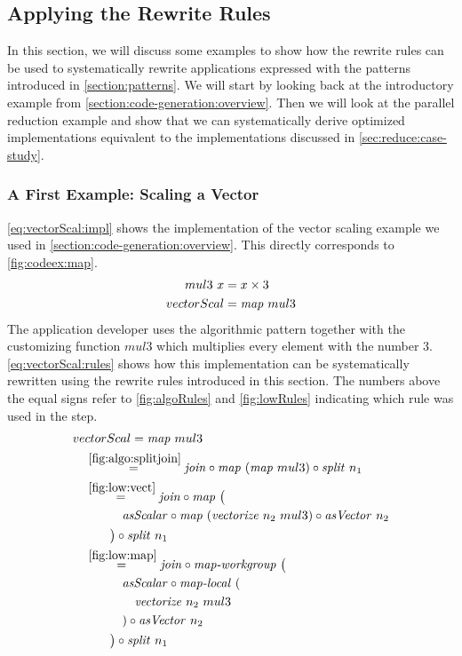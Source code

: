 \subsection{Applying the Rewrite Rules}
\label{sec:example}
\label{sec:applying:rules}
In this section, we will discuss some examples to show how the rewrite rules can be used to systematically rewrite applications expressed with the patterns introduced in \autoref{section:patterns}.
We will start by looking back at the introductory example from \autoref{section:code-generation:overview}.
Then we will look at the parallel reduction example and show that we can systematically derive optimized implementations equivalent to the implementations discussed in \autoref{sec:reduce:case-study}.

\subsubsection{A First Example: Scaling a Vector}
\autoref{eq:vectorScal:impl} shows the implementation of the vector scaling example we used in \autoref{section:code-generation:overview}.
This directly corresponds to \autoref{fig:codeex:map}.
\begin{align}
  mul3\ x &= x \times 3\nonumber\\
  vectorScal &= \text{\textit{map}}\ mul3
  \label{eq:vectorScal:impl}
\end{align}
The application developer uses the algorithmic pattern \map together with the customizing function $mul3$ which multiplies every element with the number $3$.
\autoref{eq:vectorScal:rules} shows how this implementation can be systematically rewritten using the rewrite rules introduced in this section.
The numbers above the equal signs refer to \autoref{fig:algoRules} and \autoref{fig:lowRules} indicating which rule was used in the step.
\begin{align}
  &vectorScal = \text{\textit{map}}\ mul3\nonumber\\
  &\quad\begin{aligned}
    &\overset{\ref{fig:algo:splitjoin}}{=\hspace{.2em}}
      \text{\textit{join}} \circ \text{\textit{map}}\ (\text{\textit{map}}\ mul3) \circ \text{\textit{split}}\ n_1\\
    &\overset{\ref{fig:low:vect}}{=\hspace{.2em}}
      \text{\textit{join}} \circ \text{\textit{map}}\ \big(\\
      &\qquad\quad \text{\textit{asScalar}} \circ \text{\textit{map}}\ (\text{\textit{vectorize}}\ n_2\ mul3) \circ \text{\textit{asVector}}\ n_2\\
      &\qquad\big) \circ \text{\textit{split}}\ n_1\\
    &\overset{\ref{fig:low:map}}{=\hspace{.2em}}
      \text{\textit{join}} \circ \text{\textit{map-workgroup}}\ \big(\\
      &\qquad\quad \text{\textit{asScalar}} \circ \text{\textit{map-local}}\ (\\
      &\qquad\qquad\text{\textit{vectorize}}\ n_2\ mul3\\
      &\qquad\quad) \circ \text{\textit{asVector}}\ n_2\\
      &\qquad\big) \circ \text{\textit{split}}\ n_1
  \end{aligned}
  \label{eq:vectorScal:rules}
\end{align}
